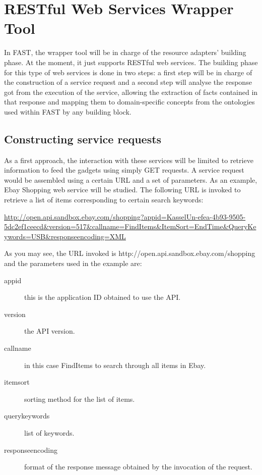\documentclass{fast_latex}
\begin{document}


\clearpage
\section{RESTful Web Services Wrapper Tool} %
\label{sec:restful_web_services_wrapper_tool}

In FAST, the wrapper tool will be in charge of the resource adapters' building phase. At the moment, it just supports RESTful web services. The building phase for this type of web services is done in two steps: a first step will be in charge of the construction of a service request and a second step will analyse the response got from the execution of the service, allowing the extraction of facts contained in that response and mapping them to domain-specific concepts from the ontologies used within FAST by any building block.

\subsection{Constructing service requests} %
\label{sub:constructing_service_requests}

As a first approach, the interaction with these services will be limited to retrieve information to feed the gadgets using simply GET requests. A service request would be assembled using a certain URL and a set of parameters. As an example, Ebay Shopping web service will be studied. The following URL is invoked to retrieve a list of items corresponding to certain search keywords:

\url{http://open.api.sandbox.ebay.com/shopping?appid=KasselUn-efea-4b93-9505-5dc2ef1ceecd&version=517&callname=FindItems&ItemSort=EndTime&QueryKeywords=USB&responseencoding=XML}

As you may see, the URL invoked is http://open.api.sandbox.ebay.com/shopping and the parameters used in the example are:
\begin{description}
	\item[appid] this is the application ID obtained to use the API.
	\item[version] the API version.
	\item[callname] in this case FindItems to search through all items in Ebay.
	\item[itemsort] sorting method for the list of items.
	\item[querykeywords] list of keywords.
	\item[responseencoding] format of the response message obtained by the invocation of the request.
\end{description}
\end{document}
